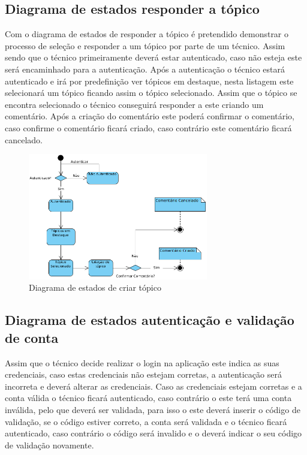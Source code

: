 \subsection{Diagrama de estados responder a tópico}

Com o diagrama de estados de responder a tópico é pretendido demonstrar o processo de seleção e 
responder a um tópico por parte de um técnico. Assim sendo que o técnico primeiramente deverá estar 
autenticado, caso não esteja este será encaminhado para a autenticação. Após a autenticação o técnico 
estará autenticado e irá por predefinição ver tópicos em destaque, nesta listagem este selecionará um 
tópico ficando assim o tópico 
selecionado. Assim que o tópico se encontra selecionado o técnico conseguirá responder a este criando 
um comentário. Após a criação do comentário este poderá confirmar o comentário, caso confirme o 
comentário ficará criado, caso contrário este comentário ficará cancelado.

\begin{figure}[htb]
    \centering
    \includegraphics[width=0.7\textwidth]{images/diagramas/estados/responder_topico_tecnico.png}
    \caption{Diagrama de estados de criar tópico}
    \label{fig:28}
\end{figure}

\newpage

\subsection{Diagrama de estados autenticação e validação de conta}

Assim que o técnico decide realizar o login na aplicação este indica as suas credenciais, caso estas 
credenciais não estejam corretas, a autenticação será incorreta e deverá alterar as credenciais. 
Caso as credenciais estejam corretas e a conta válida o técnico ficará autenticado, caso contrário o 
este terá uma conta inválida, pelo que deverá ser validada, para  isso o este deverá 
inserir o código de validação, se o código estiver correto, a conta será validada e o técnico 
ficará autenticado, caso contrário o código será invalido e o deverá indicar o seu código de 
validação novamente.

